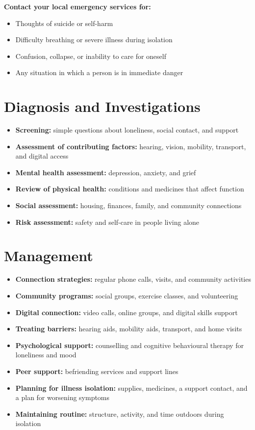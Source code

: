 \textbf{Contact your local emergency services for:}
\begin{itemize}
    \item Thoughts of suicide or self-harm
    \item Difficulty breathing or severe illness during isolation
    \item Confusion, collapse, or inability to care for oneself
    \item Any situation in which a person is in immediate danger
\end{itemize}

\section*{Diagnosis and Investigations}
\begin{itemize}
    \item \textbf{Screening:} simple questions about loneliness, social contact, and support
    \item \textbf{Assessment of contributing factors:} hearing, vision, mobility, transport, and digital access
    \item \textbf{Mental health assessment:} depression, anxiety, and grief
    \item \textbf{Review of physical health:} conditions and medicines that affect function
    \item \textbf{Social assessment:} housing, finances, family, and community connections
    \item \textbf{Risk assessment:} safety and self-care in people living alone
\end{itemize}

\section*{Management}
\begin{itemize}
    \item \textbf{Connection strategies:} regular phone calls, visits, and community activities
    \item \textbf{Community programs:} social groups, exercise classes, and volunteering
    \item \textbf{Digital connection:} video calls, online groups, and digital skills support
    \item \textbf{Treating barriers:} hearing aids, mobility aids, transport, and home visits
    \item \textbf{Psychological support:} counselling and cognitive behavioural therapy for loneliness and mood
    \item \textbf{Peer support:} befriending services and support lines
    \item \textbf{Planning for illness isolation:} supplies, medicines, a support contact, and a plan for worsening symptoms
    \item \textbf{Maintaining routine:} structure, activity, and time outdoors during isolation
\end{itemize}

